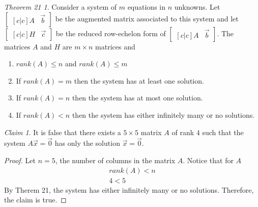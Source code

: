 \documentclass[letterpaper,12pt]{report}
\theoremstyle{remark}
\newtheorem*{claim}{Claim}
\newtheorem*{theorem21}{Theorem 21}
\begin{document}
\begin{theorem21}
Consider a system of $m$ equations in $n$ unknowns. Let $\begin{bmatrix}[c|c]A & \vec{b}\end{bmatrix}$ be the augmented matrix associated to this system and let $\begin{bmatrix}[c|c]H & \vec{c}\end{bmatrix}$ be the reduced row-echelon form of $\begin{bmatrix}[c|c]A & \vec{b}\end{bmatrix}$. The matrices $A$ and $H$ are $m \times n$ matrices and
\begin{enumerate}
  \item $rank(A) \le n$ and $rank(A) \le m$
  \item If $rank(A) = m$ then the system has at least one solution.
  \item If $rank(A) = n$ then the system has at most one solution.
  \item If $rank(A) < n$ then the system has either infinitely many or no solutions.
\end{enumerate}
\end{theorem21}

\begin{claim}
It is false that there exists a $5\times5$ matrix $A$ of rank $4$ such that the system $A\vec{x}=\vec{0}$ has only the solution $\vec{x}=\vec{0}$.
\end{claim}

\begin{proof}
Let $n = 5$, the number of columns in the matrix $A$. Notice that for $A$
\begin{align*}
  rank(A) < n \\
  4 < 5
\end{align*}
By Therem 21, the system has either infinitely many or no solutions. Therefore, the claim is true.
\end{proof}
\end{document}
